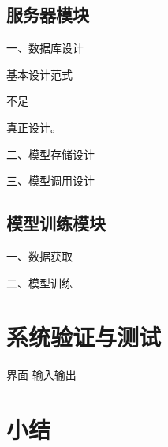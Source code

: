 \subsection{服务器模块}

一、数据库设计

基本设计范式

不足

真正设计。

二、模型存储设计

三、模型调用设计

\subsection{模型训练模块}
一、数据获取

二、模型训练

\section{系统验证与测试}
界面
输入输出
\section{小结}